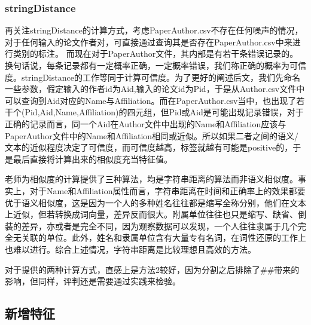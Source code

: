 \documentclass{mcmthesis}
\begin{document}
	\subsubsection{stringDistance}
		\par 再关注stringDistance的计算方式，考虑PaperAuthor.csv不存在任何噪声的情况，对于任何输入的论文作者对，可直接通过查询其是否存在PaperAuthor.csv中来进行类别的标注。
		而现在对于PaperAuthor文件，其内部是有若干条错误记录的。换句话说，每条记录都有一定概率正确，一定概率错误，我们称正确的概率为可信度。stringDistance的工作等同于计算可信度。为了更好的阐述后文，我们先命名一些参数，假定输入的作者id为Aid,输入的论文id为Pid，于是从Author.csv文件中可以查询到Aid对应的Name与Affiliation。而在PaperAuthor.csv当中，也出现了若干个(Pid,Aid,Name,Affiliation)的四元组，但Pid或Aid是可能出现记录错误，对于正确的记录而言，同一个Aid在Author文件中出现的Name和Affiliation应该与PaperAuthor文件中的Name和Affiliation相同或近似。所以如果二者之间的语义/文本的近似程度决定了可信度，而可信度越高，标签就越有可能是positive的，于是最后直接将计算出来的相似度充当特征值。
		\par 老师为相似度的计算提供了三种算法，均是字符串距离的算法而非语义相似度。事实上，对于Name和Affiliation属性而言，字符串距离在时间和正确率上的效果都要优于语义相似度，这是因为一个人的多种姓名往往都是缩写全称分别，他们在文本上近似，但若转换成词向量，差异反而很大。附属单位往往也只是缩写、缺省、倒装的差异，亦或者是完全不同，因为观察数据可以发现，一个人往往隶属于几个完全无关联的单位。此外，姓名和隶属单位含有大量专有名词，在词性还原的工作上也难以进行。综合上述情况，字符串距离是比较理想且高效的方法。
		\par 对于提供的两种计算方式，直感上是方法2较好，因为分割之后排除了\#\#带来的影响，但同样，评判还是需要通过实践来检验。
	\subsection{新增特征}
\end{document}

